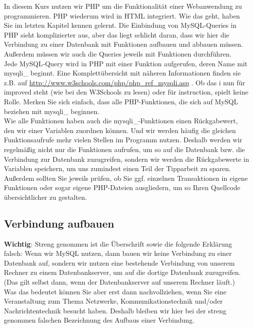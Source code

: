 In diesem Kurs nutzen wir PHP um die Funktionalität einer Webanwendung zu programmieren. PHP wiederum wird in HTML integriert. Wie das geht, haben Sie im letzten Kapitel kennen gelernt. Die Einbindung von MySQL-Queries in PHP sieht komplizierter aus, aber das liegt schlicht daran, dass wir hier die Verbindung zu einer Datenbank mit Funktionen aufbauen und abbauen müssen. Außerdem müssen wir auch die Queries jeweils mit Funktionen durchführen.\\

Jede MySQL-Query wird in PHP mit einer Funktion aufgerufen, deren Name mit mysqli\_ beginnt. Eine Komplettübersicht mit näheren Informationen finden sie z.B. auf \url{http://www.w3schools.com/php/php\_ref\_mysqli.asp} . Ob das i nun für improved steht (wie bei den W3Schools zu lesen) oder für instruction, spielt keine Rolle. Merken Sie sich einfach, dass alle PHP-Funktionen, die sich auf MySQL beziehen mit mysqli\_ beginnen.\\

Wie alle Funktionen haben auch die mysqli\_-Funktionen einen Rückgabewert, den wir einer Variablen zuordnen können. Und wir werden häufig die gleichen Funktionsaufrufe mehr vielen Stellen im Programm nutzen. Deshalb werden wir regelmäßig nicht nur die Funktionen aufrufen, um so auf die Datenbank bzw. die Verbindung zur Datenbank zuzugreifen, sondern wir werden die Rückgabewerte in Variablen speichern, um uns zumindest einen Teil der Tipparbeit zu sparen.\\

Außerdem sollten Sie jeweils prüfen, ob Sie ggf. einzelnen Transaktionen in eigene Funktionen oder sogar eigene PHP-Dateien ausgliedern, um so Ihren Quellcode übersichtlicher zu gestalten. 

\subsection{Verbindung aufbauen}

\textbf{Wichtig}: Streng genommen ist die Überschrift sowie die folgende Erklärung falsch: Wenn wir MySQL nutzen, dann bauen wir keine Verbindung zu einer Datenbank auf, sondern wir nutzen eine bestehende Verbindung von unserem Rechner zu einem Datenbankserver, um auf die dortige Datenbank zuzugreifen. (Das gilt selbst dann, wenn der Datenbankserver auf unserem Rechner läuft.) Was das bedeutet können Sie aber erst dann nachvollziehen, wenn Sie eine Veranstaltung zum Thema Netzwerke, Kommunikationstechnik und/oder Nachrichtentechnik besucht haben. Deshalb bleiben wir hier bei der streng genommen falschen Bezeichnung des Aufbaus einer Verbindung.\\

